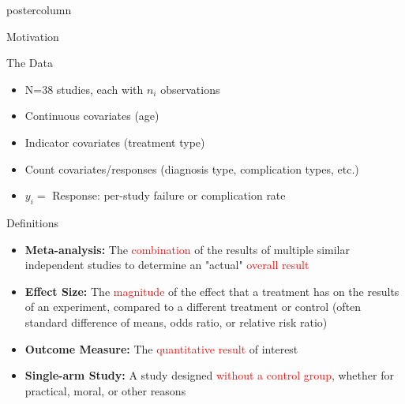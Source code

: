 \documentclass[final]{beamer}\usepackage[]{graphicx}\usepackage[]{color}
\newcommand{\red}{\textcolor{red}}
\begin{document}
{\begin{frame}
\begin{columns}
\begin{column}{.33\textwidth}
\begin{beamercolorbox}[center,wd=\textwidth]{postercolumn}
\begin{minipage}[T]{.97\textwidth}
{\begin{block}{Motivation}
\end{block}
\vfill

\begin{block}{The Data}
	
\begin{itemize}
	\item N=38 studies, each with $n_i$ observations
	\item Continuous covariates (age)
	\item Indicator covariates (treatment type)
	\item Count covariates/responses (diagnosis type, complication types, etc.)
	\item $y_i=$ Response: per-study failure or complication rate
\end{itemize}
\vspace{-0.25cm}

\end{block}
\vfill

\begin{block}{Definitions}

\begin{itemize}
	\item \textbf{Meta-analysis:} The \red{combination} of the results of multiple similar independent studies to determine an "actual" \red{overall result}
\vspace{-0.25cm}
	\item \textbf{Effect Size:} The \red{magnitude} of the effect that a treatment has on the results of an experiment, compared to a different treatment or control (often standard difference of means, odds ratio, or relative risk ratio)
\vspace{-0.25cm}
  \item \textbf{Outcome Measure:} The \red{quantitative result} of interest
\vspace{-0.25cm}
  \item \textbf{Single-arm Study:} A study designed \red{without a control group}, whether for practical, moral, or other reasons
\end{itemize}
\vspace{-0.25cm}

\end{block}
\vfill


}
\end{minipage}
\end{beamercolorbox}
\end{column}
\end{columns}
\end{frame}}
\end{document}
